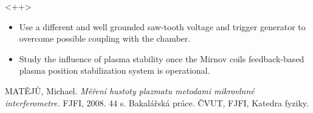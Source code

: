 \documentclass[portrait,final,a0paper]{baposter}
\def\bi{\begin{itemize}}
\def\ei{\end{itemize}}
\def\im{\item}
\begin{document}
\begin{poster}
 {
 }<++>
{
\begin{itemize}
    \item Use a different and well grounded saw-tooth voltage and trigger generator to overcome possible coupling with the chamber.
    \item Study the influence of plasma stability once the Mirnov coils feedback-based plasma position stabilization system is operational.
\end{itemize}
}


{
 MATĚJŮ, Michael. {\em Měření hustoty plazmatu metodami mikrovlnné interferometre.} FJFI, 2008. 44 s. Bakalářská práce. ČVUT, FJFI, Katedra fyziky.
 
}

\end{poster}
\end{document}
